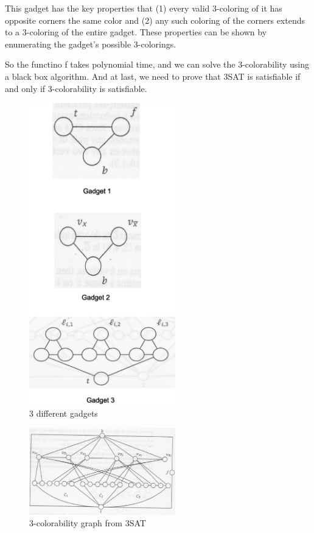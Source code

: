 \documentclass[usletter]{article}
\begin{document}
This gadget has the key properties that (1) every valid 3-coloring of it has opposite corners the same color and (2) any such coloring of the corners extends to a 3-coloring of the entire gadget. These properties can be shown by enumerating the gadget’s possible 3-colorings.

So the functino f takes polynomial time, and we can solve the 3-colorability using a black box algorithm. And at last, we need to prove that 3SAT is satisfiable if and only if 3-colorability is satisfiable.

\begin{figure}[bht]
\begin{center}
     \includegraphics[width=2.5in]{figures/gadgets}
\caption{\label{fig:gadgets}3 different gadgets}
\end{center}
\end{figure}

\begin{figure}[bht]
\begin{center}
     \includegraphics[width=2.5in]{figures/3SAT-3C}
\caption{\label{fig:3SAT-3C}3-colorability graph from 3SAT}
\end{center}
\end{figure}
\end{document}
